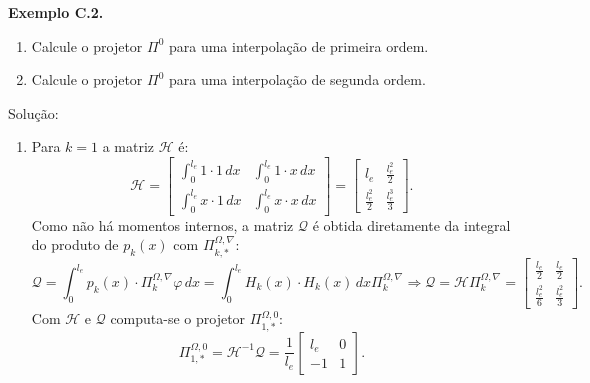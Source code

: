 \vspace{5mm}
\noindent
    \begin{tcolorbox}[breakable, colback=white, colframe=black, boxrule=0.4pt, arc=0pt, outer arc=0pt]
        \vspace{2mm} %
        \textbf{Exemplo C.2.} 
        
        \begin{enumerate}[label=\alph*), leftmargin=*]
            \item Calcule o projetor $\Pi^{0}$ para uma interpolação de primeira ordem.
            \item Calcule o projetor $\Pi^{0}$ para uma interpolação de segunda ordem.
        \end{enumerate}
        
        \hrulefill

        Solução: 
        \vspace{2mm}

        \begin{enumerate}[label=\alph*), leftmargin=*]
            \item Para $k=1$ a matriz $\mathcal{H}$ é: $$\mathcal{H} = \begin{bmatrix} \int_0^{l_e} 1 \cdot 1 \, dx & \int_0^{l_e} 1 \cdot x \, dx \\ \int_0^{l_e} x \cdot 1 \, dx & \int_0^{l_e} x \cdot x \, dx \end{bmatrix} = \begin{bmatrix} l_e &  \frac{l_e^2}{2} \\ \frac{l_e^2}{2} & \frac{l_e^3}{3} \end{bmatrix}.$$
            Como não há momentos internos, a matriz $\mathcal{Q}$ é obtida diretamente da integral do produto de $p_k(x)$ com $\Pi_{k,*}^{\Omega,\nabla}$:
            $$\mathcal{Q} = \int_0^{l_e} p_k(x) \cdot \Pi_k^{\Omega,\nabla}\varphi \, dx = \int_0^{l_e} H_k(x) \cdot H_k(x) \, dx \Pi_k^{\Omega,\nabla} \Rightarrow \mathcal{Q} = \mathcal{H}\Pi_k^{\Omega,\nabla} = \begin{bmatrix} \frac{l_e}{2} &  \frac{l_e}{2} \\ \frac{l_e^2}{6} & \frac{l_e^2}{3} \end{bmatrix}.$$
            \indent Com $\mathcal{H}$ e  $\mathcal{Q}$ computa-se o projetor $\Pi_{1,*}^{\Omega,0}$:
            $$\Pi_{1,*}^{\Omega,0} = \mathcal{H}^{-1} \mathcal{Q} = \frac{1}{l_e} \begin{bmatrix} l_e & 0 \\ -1 & 1 \end{bmatrix}.$$
            \vspace{2mm}
            

\end{enumerate}
\end{tcolorbox}
